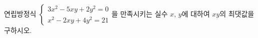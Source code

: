 연립방정식 $\begin{cases} 3x^2-5xy+2y^2=0 \\ x^2-2xy+4y^2=21 \end{cases}$을 만족시키는 실수 $x$, $y$에 대하여 $xy$의 최댓값을 구하시오.
